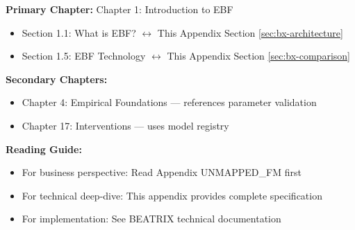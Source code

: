 %
%
%

%
%
%
%

\begin{tcolorbox}[colback=purple!5!white, colframe=purple!75!black,
    title=Chapter Linkage]

\textbf{Primary Chapter:} Chapter 1: Introduction to EBF
\begin{itemize}[nosep]
\item Section 1.1: What is EBF? $\leftrightarrow$ This Appendix Section \ref{sec:bx-architecture}
\item Section 1.5: EBF Technology $\leftrightarrow$ This Appendix Section \ref{sec:bx-comparison}
\end{itemize}

\textbf{Secondary Chapters:}
\begin{itemize}[nosep]
\item Chapter 4: Empirical Foundations --- references parameter validation
\item Chapter 17: Interventions --- uses model registry
\end{itemize}

\textbf{Reading Guide:}
\begin{itemize}[nosep]
\item For business perspective: Read Appendix UNMAPPED_FM first
\item For technical deep-dive: This appendix provides complete specification
\item For implementation: See BEATRIX technical documentation
\end{itemize}

\end{tcolorbox}

